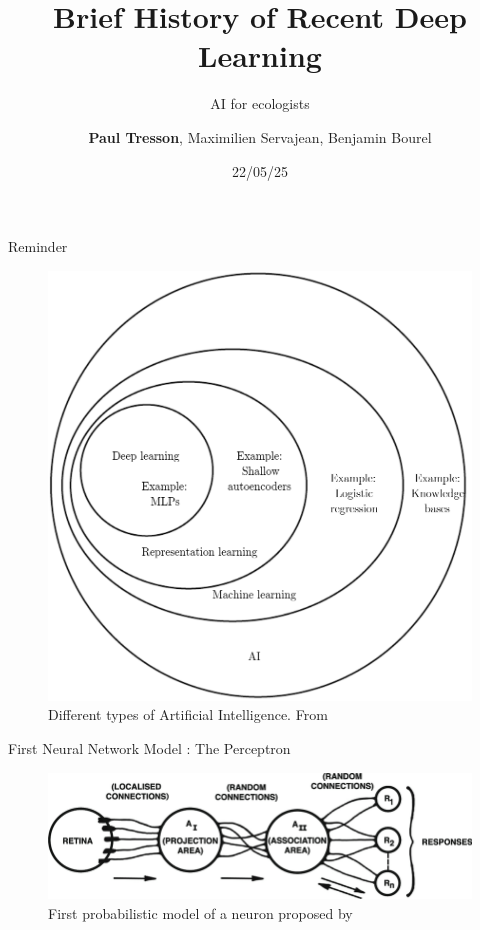 \documentclass{irdbeamer}
\title{Brief History of Recent Deep Learning}
\subtitle{AI for ecologists}
\author[Paul Tresson]{\textbf{Paul Tresson}, Maximilien Servajean, Benjamin Bourel}
\date{22/05/25} %
\let\oldcite=\cite
\renewcommand{\cite}[1]{\textcolor[rgb]{.5,.5,.7}{\oldcite{#1}}}
\begin{document}
\maketitle

\usebackgroundtemplate{}

\begin{frame}{Reminder}
    \begin{figure}
        \centering
        \vspace{-1cm}
        \includegraphics[width=0.45\linewidth]{figs/goodfellow_AI.png}
        \caption{\tiny Different types of Artificial Intelligence. From \cite{goodfellow2016deep}}
    \end{figure}
\end{frame}

\begin{frame}[t]{First Neural Network Model : The Perceptron}
    \begin{figure}
        \centering
        \includegraphics[width=\linewidth]{figs/perceptron.png}
        \caption{\tiny First probabilistic model of a neuron proposed by \cite{rosenblatt1958perceptron}}
    \end{figure}
\end{frame}
\end{document}
